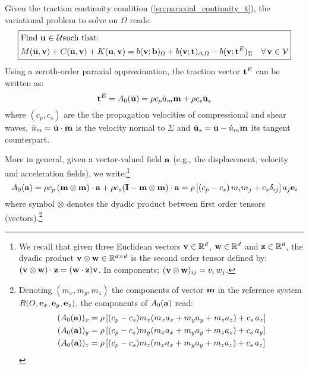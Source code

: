 Given the traction continuity condition (\ref{eq:paraxial_continuity_t}),
the variational problem to solve on $\Omega$ reads:
\begin{equation}
\boxed{\begin{aligned} & \text{Find}~{{\bf{u}}}~{\in}~{\mathcal{U}} \text{such that: }\\
 & M(\ddot{{\bf{u}}},{\bf{v}})+C(\dot{{\bf{u}}},{\bf{v}})+K({\bf{u}},{\bf{v}})=b({\bf{v}};{\bf{b}})_{\Omega}+b({\bf{v}};{\bf t})_{\partial_{t}\Omega}-b({\bf{v}};{\bf t}^{E})_{\Sigma}\quad\forall\,{\bf{v}}\in\mathcal{V}
\end{aligned}
}\label{eq:paraxial_varf_1}
\end{equation}
Using a zeroth-order paraxial approximation, the traction vector ${\bf t}^{E}$ can be written as:
\begin{equation}
{\bf t}^{E}=A_{0}(\dot{{\bf{u}}}) = \rho c_p \dot{u}_m {\bf m} + \rho c_s \dot{{\bf{u}}}_s
\label{eq:paraxial_lin_form}
\end{equation}
where $(c_p,c_s)$ are the the propagation velocities of compressional and shear waves, $\dot{u}_m = \dot{{\bf{u}}} \cdot {\bf m}$ is the velocity normal to $\Sigma$ and  $\dot{{\bf{u}}}_s = \dot{{\bf{u}}} - \dot{u}_m {\bf m}$ its tangent counterpart.

More in general, given a vector-valued field ${\bf{a}}$ (e.g., the displacement, velocity and acceleration fields), we write:\footnote{We recall that given three Euclidean vectors ${\bf{v}} \in \mathbb{R}^d$, ${\bf w}\in \mathbb{R}^d$ and ${\bf z}\in \mathbb{R}^d$, the dyadic product ${\bf{v}} \otimes {\bf w} \in \mathbb{R}^{d\times d}$ is the second order tensor defined by: $({\bf{v}} \otimes {\bf w})\cdot {\bf z} = ({\bf w}\cdot {\bf z}) {\bf{v}} $. In components: $({\bf{v}} \otimes {\bf w})_{ij}=v_i\,w_j$.}
\begin{equation}
    A_{0}({\bf{a}}) = \rho c_p \, ({\bf m} \otimes {\bf m}) \cdot {\bf{a}} + \rho c_s ({{{\bf{I}}}} - {\bf m} \otimes {\bf m}) \cdot {\bf{a}} = \rho \left[ (c_p - c_s)\, m_i m_j + c_s \delta_{ij} \right] a_j {\bf{e}}_i
\end{equation}
where symbol $\otimes$ denotes the dyadic product between first order tensors (vectors).\footnote{Denoting $(m_x,m_y,m_z)$ the components of vector ${\bf m}$ in the reference system $R(O,{\bf{e}}_x,{\bf{e}}_y,{\bf{e}}_z)$, the components of $A_{0}({\bf{a}})$ read:
\begin{align}
    (A_{0}({\bf{a}}))_x & = \rho \left[(c_p-c_s) m_x (m_x a_x + m_y a_y + m_z a_z) + c_s\,a_x \right] \\
    (A_{0}({\bf{a}}))_y & =  \rho \left[(c_p-c_s) m_y (m_x a_x + m_y a_y + m_z a_z) + c_s\,a_y \right] \\
    (A_{0}({\bf{a}}))_z & =  \rho \left[(c_p-c_s) m_z (m_x a_x + m_y a_y + m_z a_z) + c_s\,a_z \right]
\end{align}}

